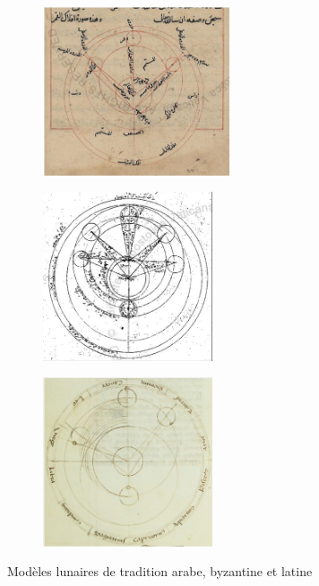 	\begin{figure}[h]
		\begin{subfigure}{0.34\linewidth}
			\centering
			\includegraphics[width=5.5cm]{images/modele_lune_arabe.png}
		\end{subfigure}
		\hspace{1pt}
		\begin{subfigure}{0.30\linewidth}
			\centering
			\includegraphics[width=5cm]{images/modele_lune_byz.png}
		\end{subfigure}
  		\hspace{1pt}
  		\begin{subfigure}{0.30\linewidth}
			\centering
			\includegraphics[width=5cm]{images/modele_lune_latin.png}
		\end{subfigure}
		\caption{Modèles lunaires de tradition arabe, byzantine et latine}
	\end{figure}
 
